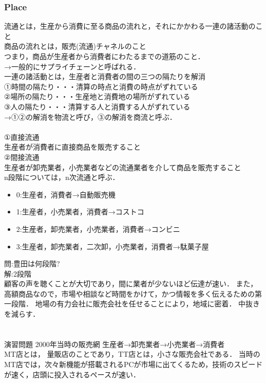\documentclass[a4paper,11pt]{ltjsarticle}
\begin{document}
\subsubsection{Place}
流通とは，生産から消費に至る商品の流れと，それにかかわる一連の諸活動のこと\\
商品の流れとは，販売(流通)チャネルのこと\\
つまり，商品が生産者から消費者にわたるまでの道筋のこと．\\
→一般的にサプライチェーンと呼ばれる．\\
一連の諸活動とは，生産者と消費者の間の三つの隔たりを解消\\
①時間の隔たり・・・清算の時点と消費の時点がずれている\\
②場所の隔たり・・・生産地と消費地の場所がずれている\\
③人の隔たり・・・清算する人と消費する人がずれている\\
→①②の解消を物流と呼び，③の解消を商流と呼ぶ．\\
\\
①直接流通\\
生産者が消費者に直接商品を販売すること\\
②間接流通\\
生産者が卸売業者，小売業者などの流通業者を介して商品を販売すること\\
n段階については，n次流通と呼ぶ．\\
\begin{itemize}
  \item 0:生産者，消費者→自動販売機
  \item 1:生産者，小売業者，消費者→コストコ
  \item 2:生産者，卸売業者，小売業者，消費者→コンビニ
  \item 3:生産者，卸売業者，二次卸，小売業者，消費者→駄菓子屋
\end{itemize}
問:豊田は何段階?\\
解:2段階\\
顧客の声を聴くことが大切であり，間に業者が少ないほど伝達が速い．
また，高額商品なので，市場や相談など時間をかけて，かつ情報を多く伝えるための第一段階．
地場の有力会社に販売会社を任せることにより，地域に密着．
中抜きを減らす．\\
\\
\\
演習問題
2000年当時の販売網
生産者→卸売業者→小売業者→消費者\\
MT店とは，
量販店のことであり，TT店とは，小さな販売会社である．
当時のMT店では，次々新機能が搭載されるPCが市場に出てくるため，技術のスピードが速く，店頭に投入されるペースが速い．\\\\
\end{document}

